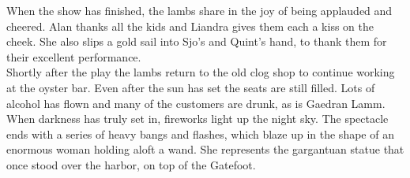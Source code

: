 When the show has finished, the lambs share in the joy of being applauded and cheered. Alan thanks all the kids and Liandra gives them each a kiss on the cheek. She also slips a gold sail into Sjo's and Quint's hand, to thank them for their excellent performance.\\

Shortly after the play the lambs return to the old clog shop to continue working at the oyster bar. Even after the sun has set the seats are still filled. Lots of alcohol has flown and many of the customers are drunk, as is Gaedran Lamm. When darkness has truly set in, fireworks light up the night sky. The spectacle ends with a series of heavy bangs and flashes, which blaze up in the shape of an enormous woman holding aloft a wand. She represents the gargantuan statue that once stood over the harbor, on top of the Gatefoot.\\

